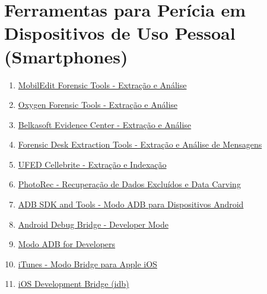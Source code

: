 \documentclass{article}
\begin{document}
\section{Ferramentas para Perícia em Dispositivos de Uso Pessoal (Smartphones)}
\begin{enumerate}
\item \href{https://www.mobiledit.com/mobiledit-forensic}{MobilEdit Forensic Tools - Extração e Análise}
\item \href{https://www.oxygen-forensic.com/en/products/oxygen-forensic-detective}{Oxygen Forensic Tools - Extração e Análise}
\item \href{https://belkasoft.com/es/bat}{Belkasoft Evidence Center - Extração e Análise}
\item \href{https://forensicdesk.com/docs/english/overview}{Forensic Desk Extraction Tools - Extração e Análise de Mensagens}
\item \href{https://www.cellebrite.com/pt/ufed-ultimate-4/}{UFED Cellebrite - Extração e Indexação}
\item \href{https://www.cgsecurity.org/wiki/TestDisk_Download}{PhotoRec - Recuperação de Dados Excluídos e Data Carving}
\item \href{https://developer.android.com/studio/releases/platform-tools}{ADB SDK and Tools - Modo ADB para Dispositivos Android}
\item \href{https://developer.android.com/studio/command-line/adb?hl=pt-br}{Android Debug Bridge - Developer Mode}
\item \href{https://developer.android.com/studio/command-line/adb?hl=pt-br}{Modo ADB for Developers}
\item \href{https://support.apple.com/pt-br/HT210384}{iTunes - Modo Bridge para Apple iOS}
\item \href{https://fbidb.io/docs/overview/}{iOS Development Bridge (idb)}
\end{enumerate}
\end{document}
